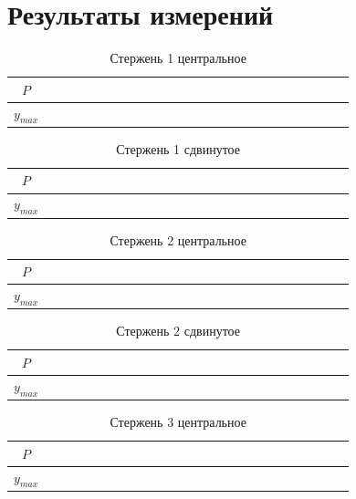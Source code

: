 \documentclass[a4paper,12pt]{article} %
\begin{document}
\section{Результаты измерений}
\begin{table}[!ht]
    \centering
    \begin{tabular}{|c|c|c|c|c|c|c|c|c|c|c}
        \hline
    $ P $   & ~~~ & ~~~ & ~~~ & ~~~ & ~~~ & ~~~ & ~~~ &  ~~~ \\ \hline
    $y_{max}$ & ~~~ & ~~~ & ~~~ & ~~~ & ~~~ & ~~~ & ~~~ &  ~~~\\ \hline
    \end{tabular}
    \caption{Стержень 1 центральное}
\end{table}
\begin{table}[!ht]
    \centering
    \begin{tabular}{|c|c|c|c|c|c|c|c|c|c|c}
        \hline
    $ P $   & ~~~ & ~~~ & ~~~ & ~~~ & ~~~ & ~~~ & ~~~ &  ~~~ \\ \hline
    $y_{max}$ & ~~~ & ~~~ & ~~~ & ~~~ & ~~~ & ~~~ & ~~~ &  ~~~\\ \hline
    \end{tabular}
    \caption{Стержень 1 сдвинутое}
\end{table}
\begin{table}[!ht]
    \centering
    \begin{tabular}{|c|c|c|c|c|c|c|c|c|c|c}
        \hline
    $ P $   & ~~~ & ~~~ & ~~~ & ~~~ & ~~~ & ~~~ & ~~~ &  ~~~ \\ \hline
    $y_{max}$ & ~~~ & ~~~ & ~~~ & ~~~ & ~~~ & ~~~ & ~~~ &  ~~~\\ \hline
    \end{tabular}
    \caption{Стержень 2 центральное}
\end{table}
\begin{table}[!ht]
    \centering
    \begin{tabular}{|c|c|c|c|c|c|c|c|c|c|c}
        \hline
    $ P $   & ~~~ & ~~~ & ~~~ & ~~~ & ~~~ & ~~~ & ~~~ &  ~~~ \\ \hline
    $y_{max}$ & ~~~ & ~~~ & ~~~ & ~~~ & ~~~ & ~~~ & ~~~ &  ~~~\\ \hline
    \end{tabular}
    \caption{Стержень 2 сдвинутое}
\end{table}
\begin{table}[!ht]
    \centering
    \begin{tabular}{|c|c|c|c|c|c|c|c|c|c|c}
        \hline
    $ P $   & ~~~ & ~~~ & ~~~ & ~~~ & ~~~ & ~~~ & ~~~ &  ~~~ \\ \hline
    $y_{max}$ & ~~~ & ~~~ & ~~~ & ~~~ & ~~~ & ~~~ & ~~~ &  ~~~\\ \hline
    \end{tabular}
    \caption{Стержень 3 центральное}
\end{table}
\end{document}
